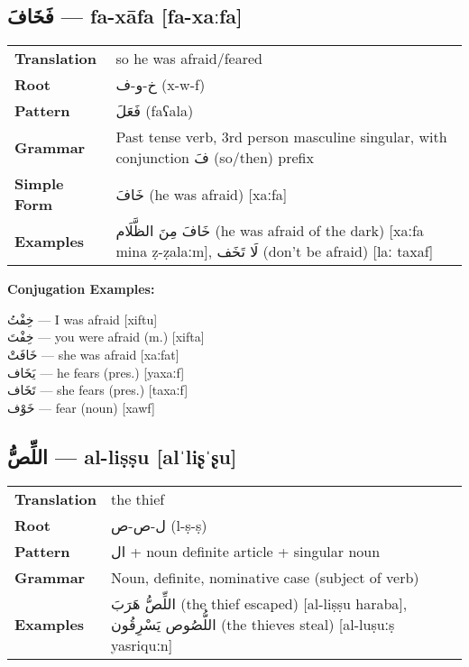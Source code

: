 \documentclass[a4paper,12pt]{article}
\begin{document}
\subsection{\textarabic{فَخَافَ} — \textbf{fa-xāfa} [fa-xaːfa]}
\begin{tabular}{p{3cm}p{10cm}}
\toprule
\textbf{Translation} & so he was afraid/feared \\
\textbf{Root} & \textarabic{خ-و-ف} (x-w-f) \\
\textbf{Pattern} & \textarabic{فَعَلَ} (faʕala) \\
\textbf{Grammar} & Past tense verb, 3rd person masculine singular, with conjunction \textarabic{فَ} (so/then) prefix \\
\textbf{Simple Form} & \textarabic{خَافَ} (he was afraid) [xaːfa] \\
\textbf{Examples} & \textarabic{خَافَ مِنَ الظَّلَام} (he was afraid of the dark) [xaːfa mina ẓ-ẓalaːm], \textarabic{لَا تَخَف} (don't be afraid) [laː taxaf] \\
\bottomrule
\end{tabular}

\textbf{Conjugation Examples:}
\begin{multicols}{2}
\small
\textarabic{خِفْتُ} — I was afraid [xiftu] \\
\textarabic{خِفْتَ} — you were afraid (m.) [xifta] \\
\textarabic{خَافَتْ} — she was afraid [xaːfat] \\
\textarabic{يَخَاف} — he fears (pres.) [yaxaːf] \\
\textarabic{تَخَاف} — she fears (pres.) [taxaːf] \\
\textarabic{خَوْف} — fear (noun) [xawf]
\end{multicols}

\subsection{\textarabic{اللِّصُّ} — \textbf{al-liṣṣu} [alˈliʂˈʂu]}
\begin{tabular}{p{3cm}p{10cm}}
\toprule
\textbf{Translation} & the thief \\
\textbf{Root} & \textarabic{ل-ص-ص} (l-ṣ-ṣ) \\
\textbf{Pattern} & \textarabic{ال} + noun definite article + singular noun \\
\textbf{Grammar} & Noun, definite, nominative case (subject of verb) \\
\textbf{Examples} & \textarabic{اللِّصُّ هَرَبَ} (the thief escaped) [al-liṣṣu haraba], \textarabic{اللُّصُوص يَسْرِقُون} (the thieves steal) [al-luṣuːṣ yasriquːn] \\
\bottomrule
\end{tabular}
\end{document}
